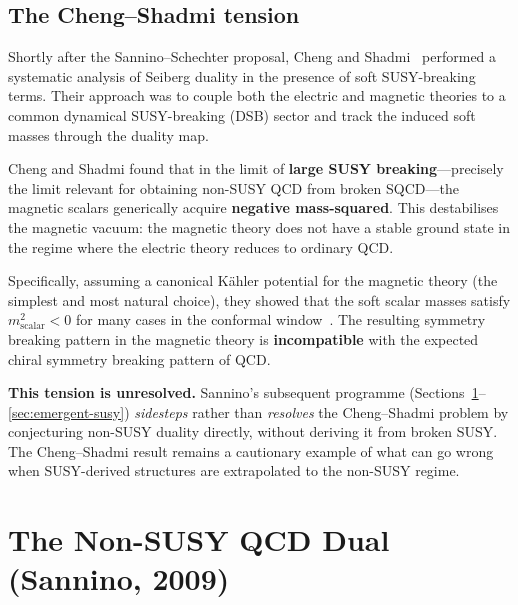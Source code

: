 \documentclass[11pt,a4paper]{article}
\begin{document}
\subsection{The Cheng--Shadmi tension}
\label{ssec:cheng-shadmi}

Shortly after the Sannino--Schechter proposal, Cheng and
Shadmi~\cite{CS1998} performed a systematic analysis of Seiberg
duality in the presence of soft SUSY-breaking terms.  Their approach
was to couple both the electric and magnetic theories to a common
dynamical SUSY-breaking (DSB) sector and track the induced soft masses
through the duality map.

\begin{warningbox}[title={Cheng--Shadmi tension (unresolved)}]
  Cheng and Shadmi found that in the limit of \textbf{large SUSY
  breaking}---precisely the limit relevant for obtaining non-SUSY
  QCD from broken SQCD---the magnetic scalars generically acquire
  \textbf{negative mass-squared}.  This destabilises the magnetic
  vacuum: the magnetic theory does not have a stable ground state in
  the regime where the electric theory reduces to ordinary QCD.

  \medskip

  Specifically, assuming a canonical K\"ahler potential for the
  magnetic theory (the simplest and most natural choice), they showed
  that the soft scalar masses satisfy $m_{\mathrm{scalar}}^2 < 0$
  for many cases in the conformal window~\cite{CS1998}.  The
  resulting symmetry breaking pattern in the magnetic theory is
  \textbf{incompatible} with the expected chiral symmetry breaking
  pattern of QCD.

  \medskip

  \textbf{This tension is unresolved.}  Sannino's subsequent
  programme (Sections~\ref{sec:qcd-dual}--\ref{sec:emergent-susy})
  \emph{sidesteps} rather than \emph{resolves} the Cheng--Shadmi
  problem by conjecturing non-SUSY duality directly, without deriving
  it from broken SUSY.  The Cheng--Shadmi result remains a cautionary
  example of what can go wrong when SUSY-derived structures are
  extrapolated to the non-SUSY regime.
\end{warningbox}


\section{The Non-SUSY QCD Dual (Sannino, 2009)}
\label{sec:qcd-dual}
\end{document}
